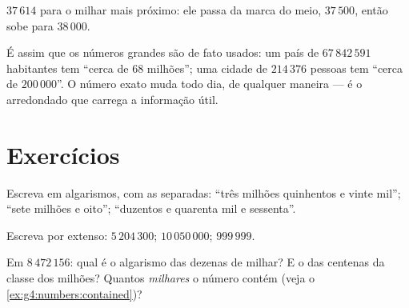 \begin{omfigure}

{\small {} $37\,614$ para o milhar mais próximo: ele passa da
marca do meio, $37\,500$, então sobe para $38\,000$.}
\end{omfigure}

\begin{example}\label{ex:g4:numbers:world}
É assim que os números grandes são de fato usados: um país de
$67\,842\,591$ habitantes tem ``cerca de $68$ milhões''; uma cidade
de $214\,376$ pessoas tem ``cerca de $200\,000$''. O número exato
muda todo dia, de qualquer maneira --- é o arredondado que carrega a
informação útil.
\end{example}

\section{Exercícios}

\begin{exercise}[$\star$]\label{exo:g4:numbers:1}
Escreva em algarismos, com as  separadas: ``três milhões
quinhentos e vinte mil''; ``sete milhões e oito''; ``duzentos e
quarenta mil e sessenta''.
\end{exercise}

\begin{exercise}[$\star$]\label{exo:g4:numbers:2}
Escreva por extenso: $5\,204\,300$; \quad $10\,050\,000$; \quad
$999\,999$.
\end{exercise}

\begin{exercise}[$\star$]\label{exo:g4:numbers:3}
Em $8\,472\,156$: qual é o algarismo das dezenas de milhar? E o das
centenas da classe dos milhões? Quantos \emph{milhares} o número
contém (veja o \cref{ex:g4:numbers:contained})?
\end{exercise}

